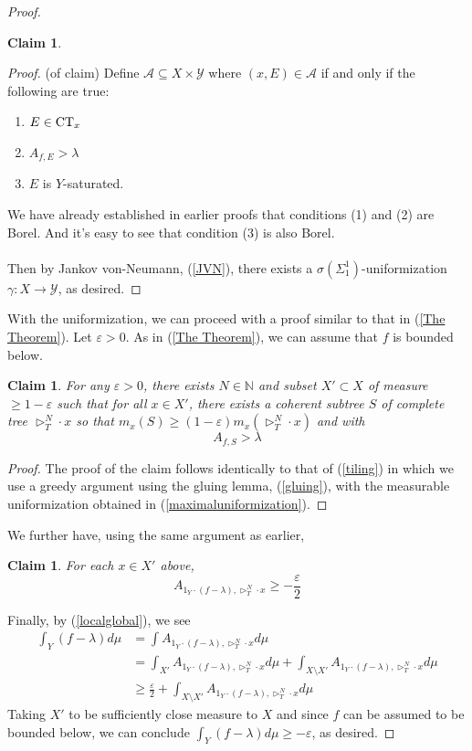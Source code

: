 \documentclass{article}
\newcommand{\CT}{\textmd{CT}}
\let\oldref\ref
\renewcommand{\ref}[1]{(\oldref{#1})}
\newtheorem{claim}[theorem]{Claim}
\theoremstyle{definition}
\begin{document}
\begin{proof}
\begin{claim}
    \end{claim}
    \begin{proof}
        (of claim) Define $ \mathcal{A}\subseteq X\times \mathcal{Y} $ where $ (x,E)\in \mathcal{A} $ if and only if the following are true:
        \begin{enumerate}
            \item $ E\in \CT_x $
            \item $ A_{f,E}>\lambda $
            \item $ E $ is $ Y $-saturated. 
        \end{enumerate}
        We have already established in earlier proofs that conditions (1) and (2) are Borel. And it's easy to see that condition (3) is also Borel.\\\\
        Then by Jankov von-Neumann, \ref{JVN}, there exists a $ \sigma(\Sigma^1_1) $-uniformization $ \gamma:X\to \mathcal{Y} $, as desired.
    \end{proof}
    \noindent With the uniformization, we can proceed with a proof similar to that in \ref{The Theorem}. Let $ \varepsilon>0 $. As in \ref{The Theorem}, we can assume that $ f $ is bounded below. 
    \begin{claim}
        For any $ \varepsilon>0 $, there exists $ N\in \mathbb{N} $ and subset $ X'\subset X $ of measure $ \geq 1-\varepsilon $ such that for all $ x\in X' $, there exists a coherent subtree $ S $ of complete tree $ \triangleright^N_T\cdot x $ so that $ m_x(S)\geq (1-\varepsilon)m_x(\triangleright_T^N\cdot x) $ and with
        \[
        A_{f,S}>\lambda 
        \]
    \end{claim}
    \begin{proof}
        The proof of the claim follows identically to that of \ref{tiling} in which we use a greedy argument using the gluing lemma, \ref{gluing}, with the measurable uniformization obtained in \ref{maximaluniformization}.
    \end{proof}
    \noindent We further have, using the same argument as earlier,
    \begin{claim}
        For each $ x\in X' $ above,
        \[
        A_{1_Y\cdot(f-\lambda),\triangleright^N_T\cdot x} \geq -\frac{\varepsilon}{2}
        \]
    \end{claim}
    \noindent Finally, by \ref{localglobal}, we see
    \begin{align*}
        \int_Y (f-\lambda)d\mu &= \int A_{1_Y\cdot (f-\lambda),\triangleright_T^N\cdot x}d\mu\\
        &= \int_{X'} A_{1_Y\cdot (f-\lambda),\triangleright^N_T\cdot x} d\mu + \int_{X\setminus X'}A_{1_Y\cdot (f-\lambda),\triangleright^N_T\cdot x} d\mu \\
        &\geq \frac{\varepsilon}{2} + \int_{X\setminus X'} A_{1_Y\cdot (f-\lambda),\triangleright^N_T\cdot x}d\mu
    \end{align*}
    Taking $ X' $ to be sufficiently close measure to $ X $ and since $ f $ can be assumed to be bounded below, we can conclude $ \int_{Y}(f-\lambda)d\mu \geq -\varepsilon $, as desired.
\end{proof}
\end{document}
